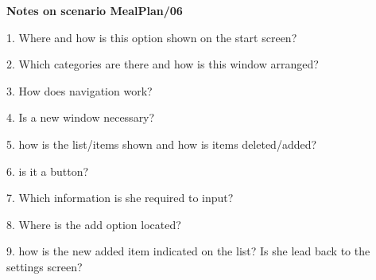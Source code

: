 \textbf{Notes on scenario MealPlan/06}

1. Where and how is this option shown on the start screen? 

2. Which categories are there and how is this window arranged?

3. How does navigation work?

4. Is a new window necessary?

5. how is the list/items shown and how is items deleted/added?

6. is it a button?

7. Which information is she required to input?

8. Where is the add option located?

9. how is the new added item indicated on the list? Is she lead back to the settings screen?

